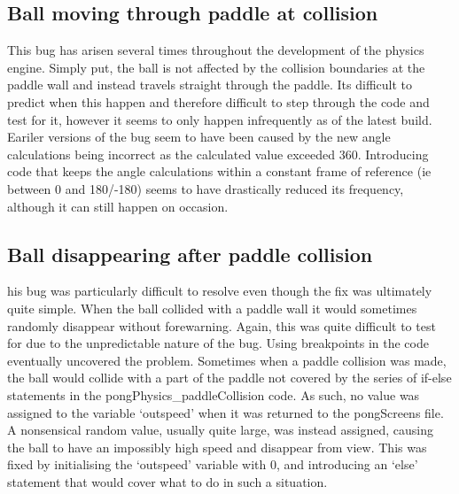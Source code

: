 \documentclass[a4paper,12pt]{article}
\begin{document}
\subsection{Ball moving through paddle at collision}
\begin{flushleft}
This bug has arisen several times throughout the development of the physics engine. Simply put, the ball is not affected by the collision boundaries at the paddle wall and instead travels straight through the paddle. Its difficult to predict when this happen and therefore difficult to step through the code and test for it, however it seems to only happen infrequently as of the latest build. Eariler versions of the bug seem to have been caused by the new angle calculations being incorrect as the calculated value exceeded 360. Introducing code that keeps the angle calculations within a constant frame of reference (ie between 0 and 180/-180) seems to have drastically reduced its frequency, although it can still happen on occasion.
\end{flushleft}
\subsection{Ball disappearing after paddle collision}
\begin{flushleft}
his bug was particularly difficult to resolve even though the fix was ultimately quite simple. When the ball collided with a paddle wall it would sometimes randomly disappear without forewarning. Again, this was quite difficult to test for due to the unpredictable nature of the bug. Using breakpoints in the code eventually uncovered the problem. Sometimes when a paddle collision was made, the ball would collide with a part of the paddle not covered by the series of if-else statements in the pongPhysics\_paddleCollision code. As such, no value was assigned to the variable ‘outspeed’ when it was returned to the pongScreens file. A nonsensical random value, usually quite large, was instead assigned, causing the ball to have an impossibly high speed and disappear from view. This was fixed by initialising the ‘outspeed’ variable with 0, and introducing an ‘else’ statement that would cover what to do in such a situation.
\end{flushleft}
\newpage
\end{document}
